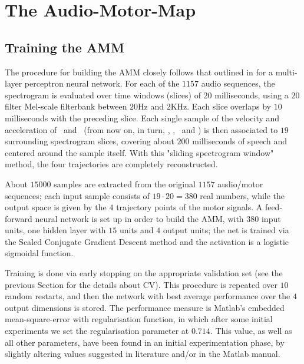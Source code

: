 \section{The Audio-Motor-Map}
\label{sec:rec}

\subsection{Training the AMM}
\label{subsec:amm_setup}

The procedure for building the AMM closely follows that outlined in
\cite{papcun,richmond2002,richmond2007} for a multi-layer perceptron neural network.
For each of the $1157$ audio sequences, the spectrogram is evaluated
over time windows (slices) of $20$ milliseconds, using a $20$ filter
Mel-scale filterbank between $20$Hz and $2$KHz. Each slice overlaps by $10$ milliseconds with
the preceding slice. Each single sample of the velocity and acceleration
of \lio\ and \ttu\ (from now on, in turn, \vlio, \alio, \vttu\ and \attu) is
then associated to $19$ surrounding spectrogram slices, covering
about $200$ milliseconds of speech and centered around the sample itself. With this
"sliding spectrogram window" method, the four trajectories are completely reconstructed.

About $15000$ samples are extracted from the original $1157$
audio/motor sequences; each input sample consists of $19\cdot 20 = 380$ real
numbers, while the output space is given by the $4$ trajectory points of
the motor signals. A feed-forward neural network is set up in order to
build the AMM, with $380$ input units, one hidden layer with $15$ units and
$4$ output units; the net is trained via the Scaled Conjugate Gradient
Descent method \cite{MOLLER93} and the activation is a logistic sigmoidal function.

Training is done via early stopping on the appropriate validation set (see the previous
Section for the details about CV). This procedure is repeated over $10$ random restarts, and then
the network with best average performance over the $4$ output dimensions is stored.
The performance measure is Matlab's embedded mean-square-error with regularisation
function, in which after some initial experiments we set the regularisation
parameter at $0.714$. This value, as well as all other parameters, have been found in
an initial experimentation phase, by slightly altering values suggested in literature
and/or in the Matlab manual.

